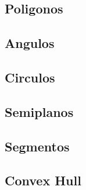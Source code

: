 \subsection{Poligonos}
\raggedbottom
\hrulefill
\subsection{Angulos}
\raggedbottom
\hrulefill
\subsection{Circulos}
\raggedbottom
\hrulefill
\subsection{Semiplanos}
\raggedbottom
\hrulefill
\subsection{Segmentos}
\raggedbottom
\hrulefill
\subsection{Convex Hull}
\raggedbottom
\hrulefill

